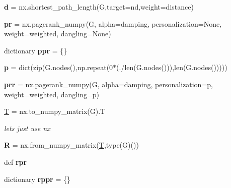 \begin{DoxyCompactItemize}
\mbox{\label{namespacedsmacc_1_1vis_1_1degree_a70eb77da8afeaced6159f751ea250926}} 
{\bfseries d} = nx.\+shortest\+\_\+path\+\_\+length(G,target=nd,weight=\textquotesingle{}distance\textquotesingle{})
\item 
\mbox{\label{namespacedsmacc_1_1vis_1_1degree_a42526ce15225b63dcee5daffc9a9c197}} 
{\bfseries pr} = nx.\+pagerank\+\_\+numpy(G, alpha=damping, personalization=None, weight=\textquotesingle{}weighted\textquotesingle{}, dangling=None)
\item 
\mbox{\label{namespacedsmacc_1_1vis_1_1degree_ab0b2bb83926f1e21b0cb96e05d10da46}} 
dictionary {\bfseries ppr} = \{\}
\item 
\mbox{\label{namespacedsmacc_1_1vis_1_1degree_a6adbca1f287f01cfa47dfebf80c5ba33}} 
{\bfseries p} = dict(zip(G.\+nodes(),np.\+repeat(0$\ast$(./len(G.\+nodes())),len(G.\+nodes()))))
\item 
\mbox{\label{namespacedsmacc_1_1vis_1_1degree_ab314f568560fa9dc1e51bd96ceca6e37}} 
{\bfseries prr} = nx.\+pagerank\+\_\+numpy(G, alpha=damping, personalization=p, weight=\textquotesingle{}weighted\textquotesingle{}, dangling=p)
\item 
\mbox{\hyperlink{namespacedsmacc_1_1vis_1_1degree_adbb4d4199b32ac300a4805757fd0e02b}{T}} = nx.\+to\+\_\+numpy\+\_\+matrix(G).T
\begin{DoxyCompactList}\small\item\em lets just use nx \end{DoxyCompactList}\item 
\mbox{\label{namespacedsmacc_1_1vis_1_1degree_ae686a501d453e8d12740cd9640ffb664}} 
{\bfseries R} = nx.\+from\+\_\+numpy\+\_\+matrix(\mbox{\hyperlink{namespacedsmacc_1_1vis_1_1degree_adbb4d4199b32ac300a4805757fd0e02b}{T}},type(G)())
\item 
def {\bfseries rpr}
\item 
\mbox{\label{namespacedsmacc_1_1vis_1_1degree_a7fd6aa40de3132e4be42de1ebb349228}} 
dictionary {\bfseries rppr} = \{\}
\item 

\end{DoxyCompactItemize}
